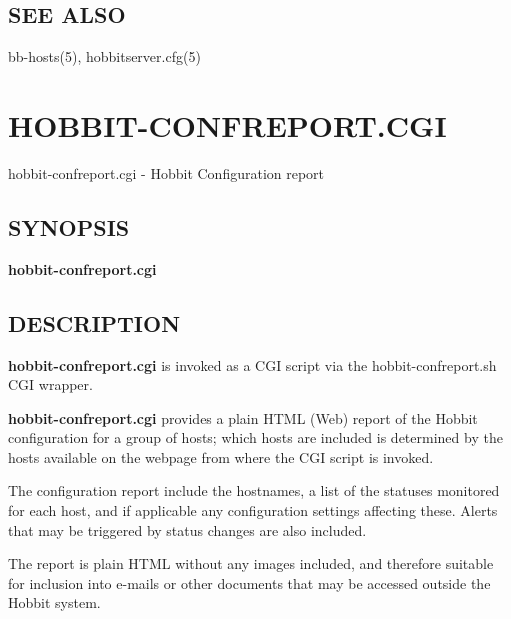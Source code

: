 \subsection{SEE ALSO}
bb-hosts(5), hobbitserver.cfg(5) 

 

%
\newpage
\section{HOBBIT-CONFREPORT.CGI}
 hobbit-confreport.cgi - Hobbit Configuration report

 \subsection{SYNOPSIS}
\textbf{hobbit-confreport.cgi}

 
\subsection{DESCRIPTION}
\textbf{hobbit-confreport.cgi}
 is invoked as a CGI script via the hobbit-confreport.sh CGI wrapper. 

 \textbf{hobbit-confreport.cgi}
 provides a plain HTML (Web) report of the Hobbit configuration for a
 group of hosts; which hosts are included is determined by the hosts
 available on the webpage from where the CGI script is invoked. 



  The configuration report include the hostnames, a list of the
  statuses monitored for each host, and if applicable any
  configuration settings affecting these. Alerts that may be triggered
  by status changes are also included. 



  The report is plain HTML without any images included, and therefore
  suitable for inclusion into e-mails or other documents that may be
  accessed outside the Hobbit system. 



 
